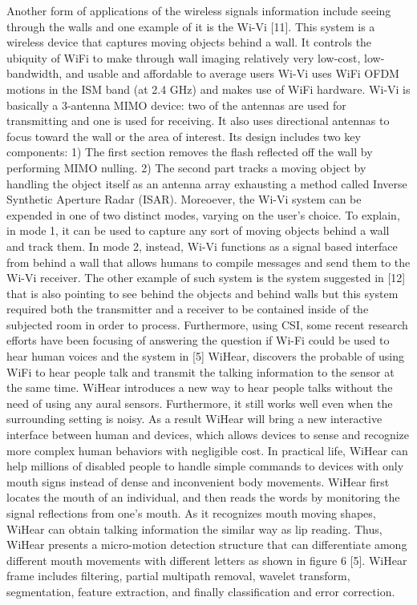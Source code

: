 \documentclass[conference]{IEEEtran}
\begin{document}
Another form of applications of the wireless signals information include seeing through the 
walls and one example of it is the Wi-Vi [11]. This system is a wireless device that captures 
moving objects behind a wall. It controls the ubiquity of WiFi to make through wall 
imaging relatively very low-cost, low-bandwidth, and usable and affordable to average users
Wi-Vi uses WiFi OFDM motions in the ISM band (at 2.4 GHz) and makes use of WiFi 
hardware. Wi-Vi is basically a 3-antenna MIMO device: two of the antennas are used for 
transmitting and one is used for receiving. It also uses directional antennas to focus toward the wall or the area of interest. Its design includes two key components: 
1) The first section removes the flash reflected off the wall by performing MIMO 
nulling. 2) The second part tracks a moving object by handling the object itself as an antenna array exhausting a method called Inverse Synthetic Aperture Radar (ISAR). \newline
Moreoever, the Wi-Vi system can be expended in one of two distinct modes, varying on the user’s choice. To explain, in mode 1, it can be used to capture any sort of moving objects behind a wall and track them. In mode 2, instead, Wi-Vi functions as a signal based interface from behind a wall that allows humans to compile messages and send them to the Wi-Vi receiver. The other example of such system is the system 
suggested in [12] that is also pointing to see behind the objects and behind walls but this system required both the transmitter and a receiver to be contained inside of the subjected room in order to process. \newline
Furthermore, using CSI, some recent research efforts have been focusing of answering the question if Wi-Fi could be used to hear human voices and the system in [5] WiHear, discovers the probable of using WiFi to hear  people talk and transmit  the  talking information to the sensor at the same time. 
WiHear introduces a new way to hear people talks without the need of using any aural sensors. Furthermore, it  still works  well even when the surrounding setting is noisy. As a result
 WiHear will bring a new interactive interface between human and devices, which allows devices to sense and recognize more complex human behaviors with negligible cost. In practical life, WiHear can help millions of disabled people to handle simple commands to devices with only mouth signs instead of dense and inconvenient body movements.  WiHear first locates the mouth of an individual, and then reads the words by monitoring the signal reflections from one’s mouth.  As it recognizes mouth moving shapes, WiHear can obtain talking information the similar way as lip reading.  Thus, WiHear presents a micro-motion detection structure  that  can  differentiate among different mouth movements with different letters as shown in figure 6 [5]. WiHear frame includes  filtering,  partial multipath  removal,  wavelet  transform, segmentation,  feature  extraction,  and  finally classification and error correction.
 
\end{document}
